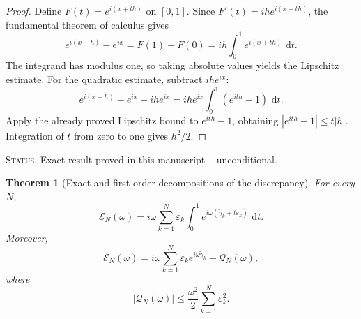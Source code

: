 \documentclass[11pt]{amsart}
\numberwithin{equation}{section}
\theoremstyle{plain}
\newtheorem{theorem}{Theorem}[section]
\theoremstyle{definition}
\theoremstyle{remark}
\newcommand{\1}{\mathbf{1}}
\newcommand{\dd}{\,\mathrm{d}}
\newcommand{\statusnote}[1]{%
  \par\smallskip\noindent
  \begingroup\footnotesize\textsc{Status.} #1\endgroup
  \par\smallskip}
\begin{document}
\begin{proof}
Define \(F(t)=e^{i(x+th)}\) on \([0,1]\).  Since
\(F'(t)=ihe^{i(x+th)}\), the fundamental theorem of calculus gives
\begin{equation}
e^{i(x+h)}-e^{ix}
=
F(1)-F(0)
=
ih\int_0^1e^{i(x+th)}\,\dd t.
\label{eq:phase_perturbation_ftc_detailed}
\end{equation}
The integrand has modulus one, so taking absolute values yields the
Lipschitz estimate.  For the quadratic estimate, subtract \(ihe^{ix}\):
\begin{equation}
e^{i(x+h)}-e^{ix}-ihe^{ix}
=
ihe^{ix}\int_0^1(e^{ith}-1)\,\dd t.
\label{eq:phase_quadratic_identity_detailed}
\end{equation}
Apply the already proved Lipschitz bound to \(e^{ith}-1\), obtaining
\(|e^{ith}-1|\leq t|h|\).  Integration of \(t\) from zero to one gives
\(h^2/2\).
\end{proof}

\statusnote{Exact result proved in this manuscript -- unconditional.}
\begin{theorem}[Exact and first-order decompositions of the discrepancy]
\label{thm:indexed_discrepancy_decomposition}
For every \(N\),
\begin{equation}
\mathcal E_N(\omega)
=
i\omega
\sum_{k=1}^{N}
\varepsilon_k
\int_0^1
 e^{i\omega(\widetilde\gamma_k+t\varepsilon_k)}\,\dd t.
\label{eq:exact_indexed_discrepancy}
\end{equation}
Moreover,
\begin{equation}
\mathcal E_N(\omega)
=
i\omega\sum_{k=1}^{N}
\varepsilon_ke^{i\omega\widetilde\gamma_k}
+
\mathcal Q_N(\omega),
\label{eq:first_order_indexed_discrepancy}
\end{equation}
where
\begin{equation}
|\mathcal Q_N(\omega)|
\leq
\frac{\omega^2}{2}
\sum_{k=1}^{N}\varepsilon_k^2.
\label{eq:indexed_discrepancy_remainder}
\end{equation}
\end{theorem}
\end{document}
